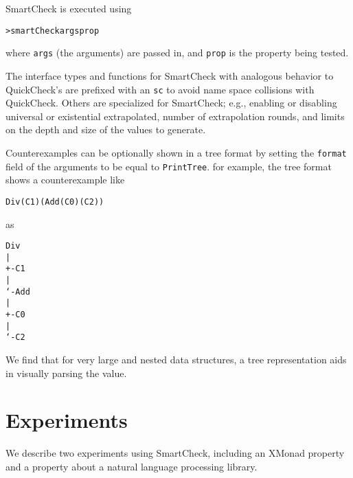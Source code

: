 \documentclass{sigplanconf}
\newenvironment{code}{\begin{alltt}\footnotesize}{\end{alltt}}
\newcommand{\ttp}[1]{\texttt{#1}}
\begin{document}
SmartCheck is executed using
%
\begin{code}
> smartCheck args prop
\end{code}
%
\noindent
where \ttp{args} (the arguments) are passed in, and \ttp{prop} is the property
being tested.

The interface types and functions for SmartCheck with analogous behavior to
QuickCheck's are prefixed with an \ttp{sc} to avoid name space collisions with
QuickCheck.  Others are specialized for SmartCheck; e.g., enabling or disabling
universal or existential extrapolated, number of extrapolation rounds, and
limits on the depth and size of the values to generate.

Counterexamples can be optionally shown in a tree format by setting the
\ttp{format} field of the arguments to be equal to \ttp{PrintTree}.  for
example, the tree format shows a counterexample like
%
\begin{code}
Div (C 1) (Add (C 0) (C 2))
\end{code}
%
\noindent
as
%
\begin{samepage}
\begin{code}
Div
|
+- C 1
|
`- Add
   |
   +- C 0
   |
   `- C 2
\end{code}
\end{samepage}
%
\noindent
We find that for very large and nested data structures, a tree representation
aids in visually parsing the value.

\section{Experiments}\label{sec:experiments}
We describe two experiments using SmartCheck, including an XMonad property and a
property about a natural language processing library.
\end{document}
